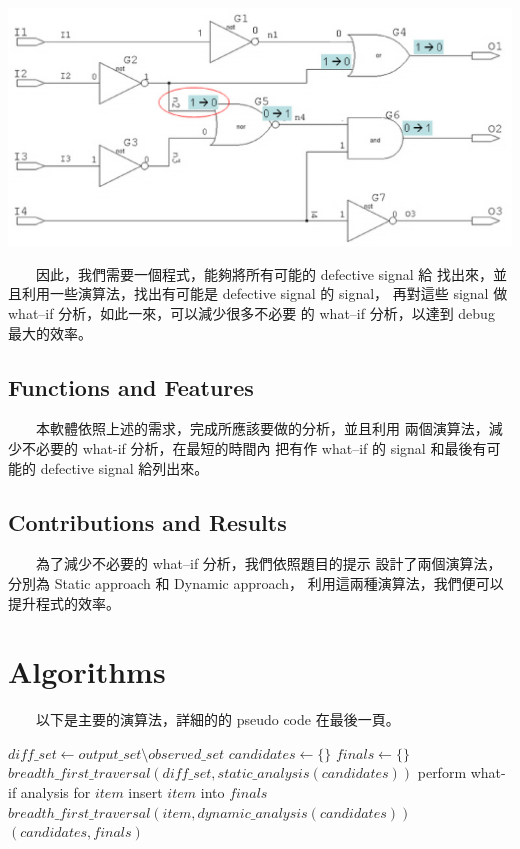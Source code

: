 \documentclass[12pt,a4paper]{article}
\begin{document}
\begin{center}
\includegraphics[scale=0.6]{imgs/02.eps}
\end{center}

　　因此，我們需要一個程式，能夠將所有可能的 defective signal 給%
找出來，並且利用一些演算法，找出有可能是 defective signal 的 signal，%
再對這些 signal 做 what–if 分析，如此一來，可以減少很多不必要%
的 what–if 分析，以達到 debug 最大的效率。

\subsection{Functions and Features}

　　本軟體依照上述的需求，完成所應該要做的分析，並且利用%
兩個演算法，減少不必要的 what-if 分析，在最短的時間內%
把有作 what–if 的 signal 和最後有可能的 defective signal 給列出來。%

\subsection{Contributions and Results}

　　為了減少不必要的 what–if 分析，我們依照題目的提示%
設計了兩個演算法，分別為 Static approach 和 Dynamic approach，%
利用這兩種演算法，我們便可以提升程式的效率。

\section{Algorithms}

　　以下是主要的演算法，詳細的的 pseudo code 在最後一頁。

{\linespread{1}

\begin{algorithm}
\caption{$analysis(output\_set, observed\_set)$}
\begin{algorithmic}[1]
\STATE $diff\_set \leftarrow output\_set \setminus observed\_set$
\STATE $candidates \leftarrow \{\}$
\STATE $finals \leftarrow \{\}$
\STATE $breadth\_first\_traversal(diff\_set, static\_analysis(candidates))$
    \STATE perform what-if analysis for $item$
        \STATE insert $item$ into $finals$
    \ELSE
        \STATE $breadth\_first\_traversal(item, dynamic\_analysis(candidates))$
    \ENDIF
\ENDFOR
\RETURN $(candidates, finals)$
\end{algorithmic}
\end{algorithm}

}
\end{document}
